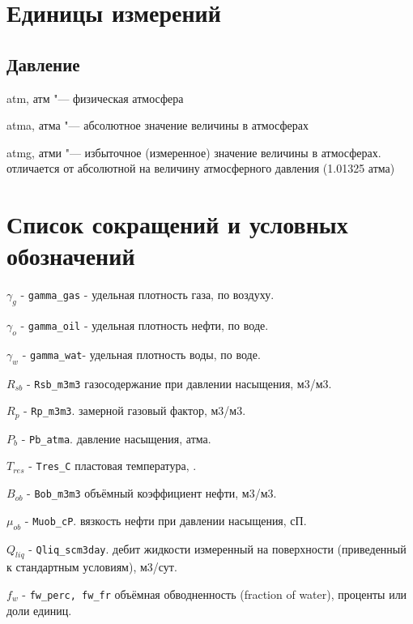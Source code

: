 \chapter*{Единицы измерений} %
\noindent

\section*{Давление}
 
 atm, атм "--- физическая атмосфера 
 
 atma, атма "--- абсолютное значение величины в атмосферах
 
 atmg, атми "--- избыточное (измеренное) значение величины в атмосферах. отличается от абсолютной на величину атмосферного давления (1.01325 атма)

\chapter*{Список сокращений и условных обозначений} %
\noindent

$\gamma_g$  - \texttt{gamma_gas} - удельная плотность газа, по воздуху. 

$\gamma_o$  - \texttt{gamma_oil} - удельная плотность нефти, по воде.

$\gamma_w$  - \texttt{gamma_wat}- удельная плотность воды, по воде. 

$R_{sb}$ - \texttt{Rsb_m3m3} газосодержание при давлении насыщения, м3/м3. 

$R_p$ - \texttt{Rp_m3m3}. замерной газовый фактор, м3/м3.

$P_b$ - \texttt{Pb_atma}. давление насыщения, атма.  

$T_{res}$ - \texttt{Tres_C} пластовая температура, \textcelsius. 

$B_{ob}$ - \texttt{Bob_m3m3} объёмный коэффициент нефти, м3/м3. 

$\mu_{ob}$ - \texttt{Muob_cP}. вязкость нефти при давлении насыщения, сП. 

$Q_{liq}$ - \texttt{Qliq_scm3day}. дебит жидкости измеренный на поверхности (приведенный к стандартным условиям), м3/сут. 

$f_{w}$ - \texttt{fw_perc, fw_fr} объёмная обводненность (fraction of water), проценты или доли единиц. 